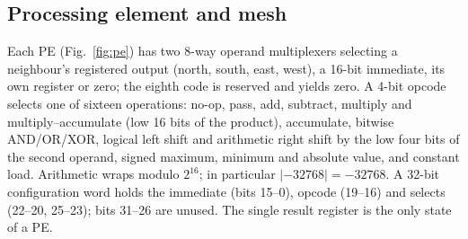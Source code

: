 \subsection{Processing element and mesh}

Each PE (Fig.~\ref{fig:pe}) has two 8-way operand multiplexers selecting a
neighbour's registered output (north, south, east, west), a 16-bit
immediate, its own register or zero; the eighth code is reserved and yields
zero. A 4-bit opcode selects one of sixteen operations: no-op, pass, add,
subtract, multiply and multiply--accumulate (low 16 bits of the product),
accumulate, bitwise AND/OR/XOR, logical left shift and arithmetic right
shift by the low four bits of the second operand, signed maximum, minimum
and absolute value, and constant load. Arithmetic wraps modulo $2^{16}$; in
particular $|{-32768}|=-32768$. A 32-bit configuration word holds the
immediate (bits 15--0), opcode (19--16) and selects (22--20, 25--23); bits
31--26 are unused. The single result register is the only state of a PE.


